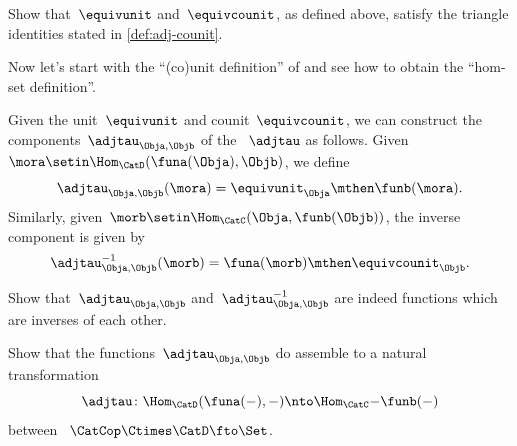\begin{solution}
    \missingsolution
\end{solution}

\begin{exercise}
    \label{ex:eta-epsilon-triangle}
    Show that~$\equivunit$ and~$\equivcounit$, as defined above, satisfy the triangle identities stated in \cref{def:adj-counit}.
\end{exercise}

\begin{solution}
    \missingsolution
\end{solution}

Now let's start with the ``(co)unit definition'' of  and see how to obtain the ``hom-set definition''.

Given the unit~$\equivunit$ and counit~$\equivcounit$, we can construct the components~$\adjtau_{\Obja,\Objb}$ of the ~$\adjtau$ as follows.
Given~$\mora \setin \Hom_{\CatD}(\funa(\Obja),\Objb)$, we define
\begin{equation}
    \adjtau_{\Obja,\Objb}(\mora) = \equivunit_\Obja \mthen \funb(\mora).
\end{equation}
Similarly, given~$\morb \setin \Hom_{\CatC}(\Obja,\funb(\Objb))$, the inverse component is given by
\begin{equation}
    \adjtau_{\Obja,\Objb}^{-1}(\morb) = \funa(\morb) \mthen \equivcounit_\Objb.
\end{equation}

\begin{exercise}
    \label{ex:tau}
    Show that~$\adjtau_{\Obja,\Objb}$ and~$\adjtau_{\Obja,\Objb}^{-1}$ are indeed functions which are inverses of each other.
\end{exercise}

\begin{solution}
    \missingsolution
\end{solution}

\begin{exercise}
    \label{ex:tau2}
    Show that the functions~$\adjtau_{\Obja,\Objb}$ do assemble to a natural transformation
    \begin{equation}
        \adjtau \colon \Hom_{\CatD}(\funa(-),- ) \nto \Hom_{\CatC}{-}{\funb(-)}
    \end{equation}
    between ~$\CatCop \Ctimes \CatD \fto \Set $.
\end{exercise}

\begin{solution}
    \missingsolution
\end{solution}
